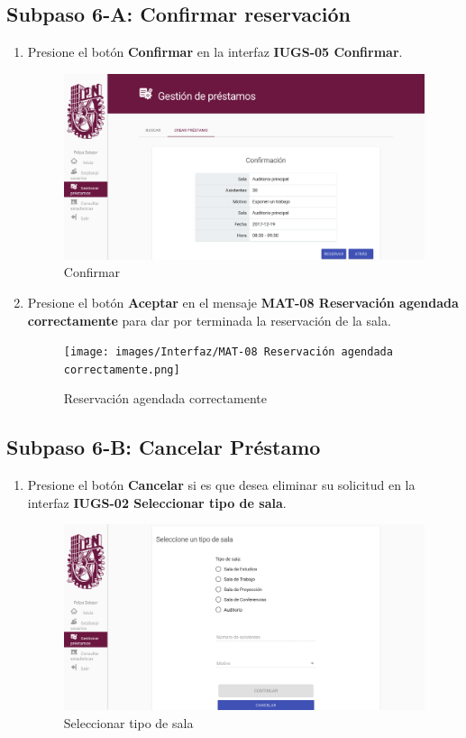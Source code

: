 \subsection{Subpaso 6-A: Confirmar reservación}
\begin{enumerate}
	\item Presione el botón \textbf{Confirmar} en la interfaz
    \textbf{IUGS-05 Confirmar}.
    \begin{figure}[hbtp]
	\includegraphics[scale=0.3]{images/Interfaz/IUGS-05 Confirmar.png}
	\caption{Confirmar}
	\end{figure}
\item Presione el botón \textbf{Aceptar} en el mensaje
    \textbf{MAT-08 Reservación agendada correctamente} para dar por
terminada la reservación de la sala.

	\begin{figure}[hbtp]
	\texttt{[image: images/Interfaz/MAT-08 Reservación agendada correctamente.png]}
	\caption{Reservación agendada correctamente}
	\end{figure}
\end{enumerate}

\subsection{Subpaso 6-B: Cancelar Préstamo}
\begin{enumerate}
	\item Presione el botón \textbf{Cancelar} si es que desea eliminar
  su solicitud en la interfaz  \textbf{IUGS-02 Seleccionar tipo de sala}.
  \begin{figure}[hbtp]
	\includegraphics[scale=0.3]{images/Interfaz/IUGS-02 Seleccionar tipo de sala.png}
	\caption{Seleccionar tipo de sala}
	\end{figure}
\end{enumerate}
